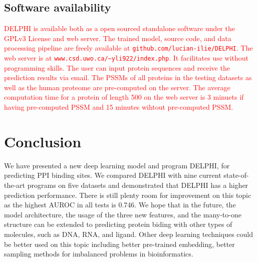 \documentclass{bioinfo}
\newcommand{\mySecondColor}{red}
\begin{document}
% 
% 
% 
% 
% 
% 
% 
%


\subsection{Software availability}
\textcolor{\mySecondColor}{DELPHI is available both as a open sourced standalone software under the GPLv3 License and web server. The trained model, source code, and data processing pipeline are freely available at \texttt{github.com/lucian-ilie/DELPHI}. The web server is at  \texttt{www.csd.uwo.ca/\textasciitilde{}yli922/index.php}.
It facilitates use without programming skills. The user can input protein sequences and receive the prediction results via email. The PSSMs of all proteins in the testing datasets as well as the human proteome are pre-computed on the server. The average computation time for a protein of length 500 on the web server is 3 minuets if having pre-computed PSSM and 15 minutes wihtout pre-computed PSSM.
}


\section{Conclusion}
We have presented a new deep learning model and program DELPHI, for predicting PPI binding sites. We compared DELPHI with nine current state-of-the-art programs on five datasets and demonstrated that DELPHI has a higher prediction performance. There is still plenty room for improvement on this topic as the highest AUROC in all tests is 0.746. 
We hope that in the future, the model architecture, the usage of the three new features, and the many-to-one structure can be extended to predicting protein biding with other types of molecules, such as DNA, RNA, and ligand. Other deep learning techniques could be better used on this topic including better pre-trained embedding, better sampling methods for imbalanced problems in bioinformatics. 
\end{document}
